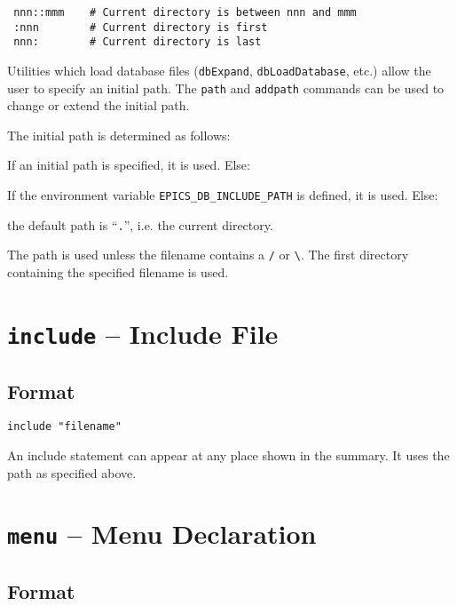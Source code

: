 \begin{verbatim}
 nnn::mmm    # Current directory is between nnn and mmm
 :nnn        # Current directory is first
 nnn:        # Current directory is last
\end{verbatim}

Utilities which load database files (\verb|dbExpand|, \verb|dbLoadDatabase|, etc.) allow the user to specify an initial path. The 
\verb|path| and \verb|addpath| commands can be used to change or extend the initial path.

The initial path is determined as follows:

\begin{description}
\item If an initial path is specified, it is used. Else:

\item If the environment variable \verb|EPICS_DB_INCLUDE_PATH| is defined, it is used. Else:

\item the default path is ``\verb|.|'', i.e. the current directory.
\end{description}

The path is used unless the filename contains a \verb|/| or \verb|\|.
The first directory containing the specified filename is used.

\section{\texttt{include} -- Include File}

\subsection{Format}

\begin{verbatim}
include "filename"
\end{verbatim}

An include statement can appear at any place shown in the summary.
It uses the path as specified above.

\section{\texttt{menu} -- Menu Declaration}

\subsection{Format}

